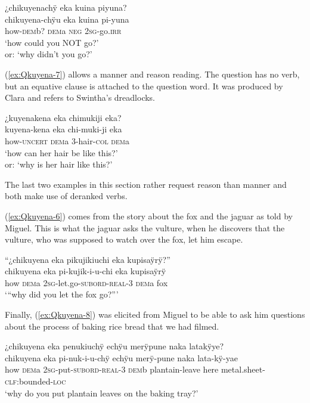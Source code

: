 \ea\label{ex:Qkuyena-5}
\begingl
\glpreamble ¿chikuyenachÿ eka kuina piyuna?\\
\gla chikuyena-chÿu eka kuina pi-yuna\\
\glb how-\textsc{dem}b? \textsc{dem}a \textsc{neg} 2\textsc{sg}-go.\textsc{irr}\\
\glft ‘how could you NOT go?’\\or: ‘why didn’t you go?’
\endgl
\trailingcitation{[jxx-p110923l-1.308]}
\xe

(\ref{ex:Qkuyena-7}) allows a manner and reason reading. The question has no verb, but an equative clause is attached to the question word. It was produced by Clara and refers to Swintha’s dreadlocks.

\ea\label{ex:Qkuyena-7}
\begingl
\glpreamble ¿kuyenakena eka chimukiji eka?\\
\gla kuyena-kena eka chi-muki-ji eka\\
\glb how-\textsc{uncert} \textsc{dem}a 3-hair-\textsc{col} \textsc{dem}a\\
\glft ‘how can her hair be like this?’\\or: ‘why is her hair like this?’
\endgl
\trailingcitation{[cux-c120414ls-2.345]}
\xe

The last two examples in this section rather request reason than manner and both make use of deranked verbs.

(\ref{ex:Qkuyena-6}) comes from the story about the fox and the jaguar as told by Miguel. This is what the jaguar asks the vulture, when he discovers that the vulture, who was supposed to watch over the fox, let him escape.

\ea\label{ex:Qkuyena-6}
\begingl
\glpreamble “¿chikuyena eka pikujikiuchi eka kupisaÿrÿ?”\\
\gla chikuyena eka pi-kujik-i-u-chi eka kupisaÿrÿ\\
\glb how \textsc{dem}a 2\textsc{sg}-let.go-\textsc{subord}-\textsc{real}-3 \textsc{dem}a fox\\
\glft ‘“why did you let the fox go?”’
\endgl
\trailingcitation{[jmx-n120429ls-x5.179]}
\xe


Finally, (\ref{ex:Qkuyena-8}) was elicited from Miguel to be able to ask him questions about the process of baking rice bread that we had filmed.

\ea\label{ex:Qkuyena-8}
\begingl
\glpreamble ¿chikuyena eka penukiuchÿ echÿu merÿpune naka latakÿye?\\
\gla chikuyena eka pi-nuk-i-u-chÿ echÿu merÿ-pune naka lata-kÿ-yae\\
\glb how \textsc{dem}a 2\textsc{sg}-put-\textsc{subord}-\textsc{real}-3 \textsc{dem}b plantain-leave here metal.sheet-\textsc{clf:}bounded-\textsc{loc}\\
\glft ‘why do you put plantain leaves on the baking tray?’
\endgl
\trailingcitation{[mxx-e120415ls.058]}
\xe


